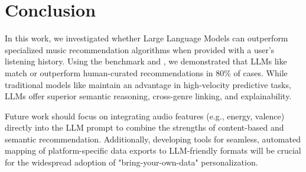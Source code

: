 \section{Conclusion}

In this work, we investigated whether Large Language Models can outperform specialized music recommendation algorithms when provided with a user's listening history. Using the \musicrs benchmark and \spotifydata, we demonstrated that LLMs like \claudesonnet match or outperform human-curated recommendations in 80\% of cases. While traditional models like \bpr maintain an advantage in high-velocity predictive tasks, LLMs offer superior semantic reasoning, cross-genre linking, and explainability.

Future work should focus on integrating audio features (e.g., energy, valence) directly into the LLM prompt to combine the strengths of content-based and semantic recommendation. Additionally, developing tools for seamless, automated mapping of platform-specific data exports to LLM-friendly formats will be crucial for the widespread adoption of "bring-your-own-data" personalization.
